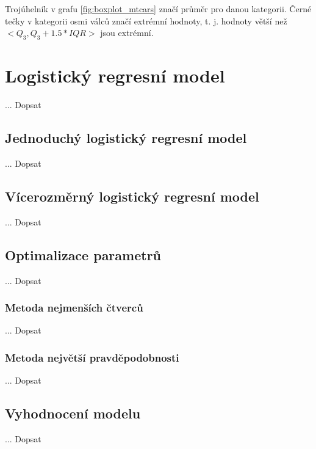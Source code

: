 Trojúhelník v grafu \ref{fig:boxplot_mtcars} značí průměr pro danou kategorii. Černé tečky v kategorii osmi válců značí extrémní hodnoty, t. j. hodnoty
větší než $<Q_3, Q_3 + 1.5 * IQR>$ jsou extrémní.

\section{Logistický regresní model}
... Dopsat

\subsection{Jednoduchý logistický regresní model}
... Dopsat

\subsection{Vícerozměrný logistický regresní model}
... Dopsat

\subsection{Optimalizace parametrů}
... Dopsat

\subsubsection{Metoda nejmenších čtverců}
... Dopsat

\subsubsection{Metoda největší pravděpodobnosti}
... Dopsat

\subsection{Vyhodnocení modelu}
... Dopsat
